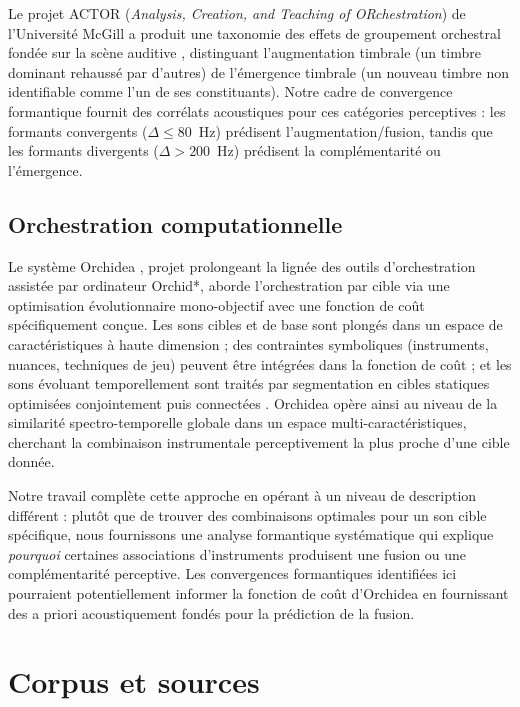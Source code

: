 \documentclass[12pt,a4paper]{article}
\begin{document}
Le projet ACTOR (\textit{Analysis, Creation, and Teaching of ORchestration}) de
l'Université McGill a produit une taxonomie des effets de groupement orchestral fondée
sur la scène auditive \citep{Goodchild2018,McAdams2022}, distinguant l'augmentation
timbrale (un timbre dominant rehaussé par d'autres) de l'émergence timbrale (un nouveau
timbre non identifiable comme l'un de ses constituants). Notre cadre de convergence
formantique fournit des corrélats acoustiques pour ces catégories perceptives : les
formants convergents ($\Delta \leq 80$~Hz) prédisent l'augmentation/fusion, tandis que
les formants divergents ($\Delta > 200$~Hz) prédisent la complémentarité ou l'émergence.

\subsection{Orchestration computationnelle}

Le système Orchidea \citep{Cella2020,Cella2021}, projet prolongeant la lignée des outils
d'orchestration assistée par ordinateur Orchid*, aborde l'orchestration par cible via
une optimisation évolutionnaire mono-objectif avec une fonction de coût spécifiquement
conçue. Les sons cibles et de base sont plongés dans un espace de caractéristiques à
haute dimension ; des contraintes symboliques (instruments, nuances, techniques de
jeu) peuvent être intégrées dans la fonction de coût ; et les sons évoluant temporellement
sont traités par segmentation en cibles statiques optimisées conjointement puis
connectées \citep{Cella2021}. Orchidea opère ainsi au niveau de la similarité
spectro-temporelle globale dans un espace multi-caractéristiques, cherchant la
combinaison instrumentale perceptivement la plus proche d'une cible donnée.

Notre travail complète cette approche en opérant à un niveau de description différent :
plutôt que de trouver des combinaisons optimales pour un son cible spécifique, nous
fournissons une analyse formantique systématique qui explique \emph{pourquoi} certaines
associations d'instruments produisent une fusion ou une complémentarité perceptive.
Les convergences formantiques identifiées ici pourraient potentiellement informer la
fonction de coût d'Orchidea en fournissant des a priori acoustiquement fondés pour
la prédiction de la fusion.

\section{Corpus et sources}
\label{sec:corpus}
\end{document}
